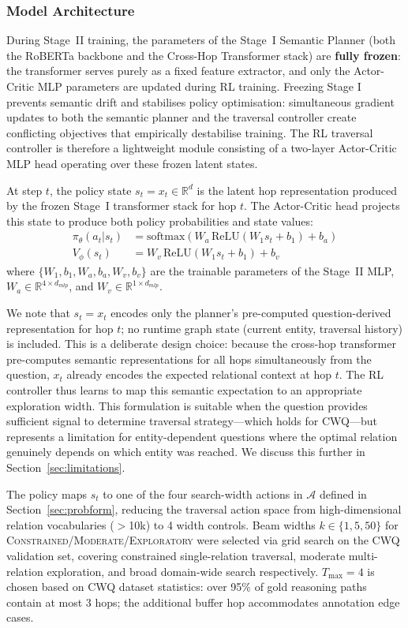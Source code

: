 \documentclass[10pt,conference]{IEEEtran}
\begin{document}
\subsubsection{Model Architecture}

During Stage~II training, the parameters of the Stage~I Semantic Planner (both the RoBERTa backbone and the Cross-Hop Transformer stack) are \textbf{fully frozen}: the transformer serves purely as a fixed feature extractor, and only the Actor-Critic MLP parameters are updated during RL training. Freezing Stage I prevents semantic drift and stabilises policy optimisation: simultaneous gradient updates to both the semantic planner and the traversal controller create conflicting objectives that empirically destabilise training. The RL traversal controller is therefore a lightweight module consisting of a two-layer Actor-Critic MLP head operating over these frozen latent states.

At step $t$, the policy state $s_t = x_t \in \mathbb{R}^{d}$ is the latent hop representation produced by the frozen Stage~I transformer stack for hop $t$. The Actor-Critic head projects this state to produce both policy probabilities and state values:
\begin{align}
\pi_\theta(a_t|s_t) &= \text{softmax}(W_a \, \text{ReLU}(W_1 s_t + b_1) + b_a) \\
V_\phi(s_t) &= W_v \, \text{ReLU}(W_1 s_t + b_1) + b_v
\end{align}
where $\{W_1, b_1, W_a, b_a, W_v, b_v\}$ are the trainable parameters of the Stage~II MLP, $W_a \in \mathbb{R}^{4 \times d_{mlp}}$, and $W_v \in \mathbb{R}^{1 \times d_{mlp}}$.

We note that $s_t = x_t$ encodes only the planner's pre-computed question-derived representation for hop $t$; no runtime graph state (current entity, traversal history) is included. This is a deliberate design choice: because the cross-hop transformer pre-computes semantic representations for all hops simultaneously from the question, $x_t$ already encodes the expected relational context at hop $t$. The RL controller thus learns to map this semantic expectation to an appropriate exploration width. This formulation is suitable when the question provides sufficient signal to determine traversal strategy---which holds for CWQ---but represents a limitation for entity-dependent questions where the optimal relation genuinely depends on which entity was reached. We discuss this further in Section~\ref{sec:limitations}.

The policy maps $s_t$ to one of the four search-width actions in $\mathcal{A}$ defined in Section~\ref{sec:probform}, reducing the traversal action space from high-dimensional relation vocabularies ($>$10k) to 4 width controls. Beam widths $k \in \{1, 5, 50\}$ for \textsc{Constrained}/\textsc{Moderate}/\textsc{Exploratory} were selected via grid search on the CWQ validation set, covering constrained single-relation traversal, moderate multi-relation exploration, and broad domain-wide search respectively. $T_{\text{max}} = 4$ is chosen based on CWQ dataset statistics: over 95\% of gold reasoning paths contain at most 3 hops; the additional buffer hop accommodates annotation edge cases.
\end{document}

